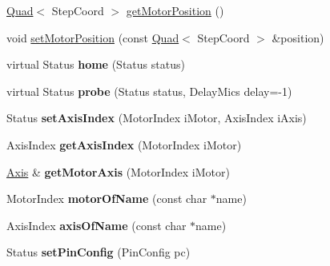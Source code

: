 \begin{DoxyCompactItemize}
\item 
\hyperlink{classfirestep_1_1_quad}{Quad}$<$ Step\+Coord $>$ \hyperlink{classfirestep_1_1_machine_abb9ab1d2cc47dca81eed644f0cc73a05}{get\+Motor\+Position} ()
\item 
void \hyperlink{classfirestep_1_1_machine_a6a92108622bf3dd555c32ffbea7b0f7a}{set\+Motor\+Position} (const \hyperlink{classfirestep_1_1_quad}{Quad}$<$ Step\+Coord $>$ \&position)
\item 
\hypertarget{classfirestep_1_1_machine_a28830b2f79fac4a0432edaf6b9a27101}{virtual Status {\bfseries home} (Status status)}\label{classfirestep_1_1_machine_a28830b2f79fac4a0432edaf6b9a27101}

\item 
\hypertarget{classfirestep_1_1_machine_a5dd121622a9f9284e51bfa0c1428c792}{virtual Status {\bfseries probe} (Status status, Delay\+Mics delay=-\/1)}\label{classfirestep_1_1_machine_a5dd121622a9f9284e51bfa0c1428c792}

\item 
\hypertarget{classfirestep_1_1_machine_a63a5c312904451636ec96ec143d3f1fd}{Status {\bfseries set\+Axis\+Index} (Motor\+Index i\+Motor, Axis\+Index i\+Axis)}\label{classfirestep_1_1_machine_a63a5c312904451636ec96ec143d3f1fd}

\item 
\hypertarget{classfirestep_1_1_machine_a48b2fc0944ac40ec8ecd06d6d877b682}{Axis\+Index {\bfseries get\+Axis\+Index} (Motor\+Index i\+Motor)}\label{classfirestep_1_1_machine_a48b2fc0944ac40ec8ecd06d6d877b682}

\item 
\hypertarget{classfirestep_1_1_machine_a22d975f5164145e181bdd1a879816082}{\hyperlink{classfirestep_1_1_axis}{Axis} \& {\bfseries get\+Motor\+Axis} (Motor\+Index i\+Motor)}\label{classfirestep_1_1_machine_a22d975f5164145e181bdd1a879816082}

\item 
\hypertarget{classfirestep_1_1_machine_a62bdc431a0fe53a0da676f97da35f744}{Motor\+Index {\bfseries motor\+Of\+Name} (const char $\ast$name)}\label{classfirestep_1_1_machine_a62bdc431a0fe53a0da676f97da35f744}

\item 
\hypertarget{classfirestep_1_1_machine_a5288737d66d3117e4593af57831d7e57}{Axis\+Index {\bfseries axis\+Of\+Name} (const char $\ast$name)}\label{classfirestep_1_1_machine_a5288737d66d3117e4593af57831d7e57}

\item 
\hypertarget{classfirestep_1_1_machine_ad38b0d760dd6eda13d06876192c6418e}{Status {\bfseries set\+Pin\+Config} (Pin\+Config pc)}\label{classfirestep_1_1_machine_ad38b0d760dd6eda13d06876192c6418e}


\end{DoxyCompactItemize}
